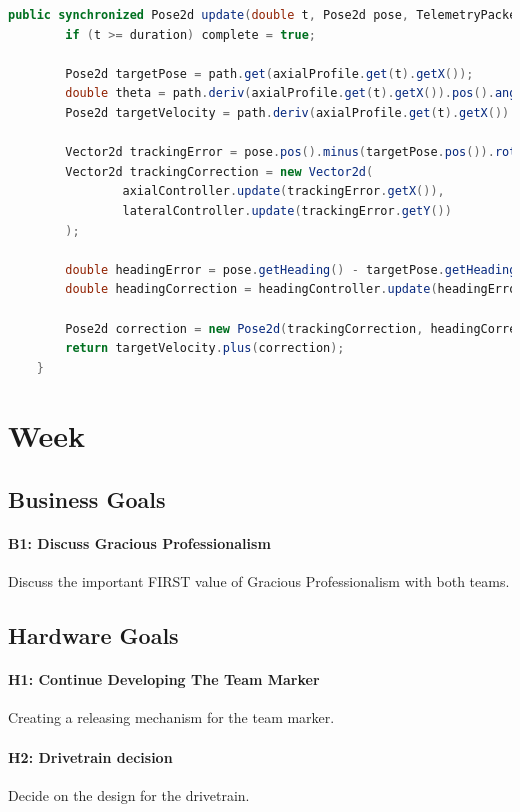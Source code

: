\documentclass{article}
\begin{document}
\begin{lstlisting}[language=Java]
public synchronized Pose2d update(double t, Pose2d pose, TelemetryPacket packet) {
        if (t >= duration) complete = true;
        
        Pose2d targetPose = path.get(axialProfile.get(t).getX());
        double theta = path.deriv(axialProfile.get(t).getX()).pos().angle();
        Pose2d targetVelocity = path.deriv(axialProfile.get(t).getX()).times(axialProfile.get(t).getV());

        Vector2d trackingError = pose.pos().minus(targetPose.pos()).rotated(-theta);
        Vector2d trackingCorrection = new Vector2d(
                axialController.update(trackingError.getX()),
                lateralController.update(trackingError.getY())
        );

        double headingError = pose.getHeading() - targetPose.getHeading();
        double headingCorrection = headingController.update(headingError);

        Pose2d correction = new Pose2d(trackingCorrection, headingCorrection);
        return targetVelocity.plus(correction);
    }
\end{lstlisting}
\clearpage \newpage \section{Week \thesection} 
\subsection{Business Goals}
\paragraph{B1: Discuss Gracious Professionalism}
 Discuss the important FIRST value of Gracious Professionalism with both teams.
\subsection{Hardware Goals}
\paragraph{H1: Continue Developing The Team Marker}
 Creating a releasing mechanism for the team marker. 
\paragraph{H2: Drivetrain decision}
 Decide on the design for the drivetrain.
\end{document}
